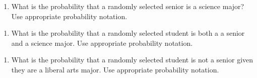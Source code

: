 \documentclass[
]{report}
\providecommand{\tightlist}{%
  \setlength{\itemsep}{0pt}\setlength{\parskip}{0pt}}
\begin{document}
\begin{enumerate}
\def\labelenumi{\alph{enumi}.}
\tightlist
\item
  What is the probability that a randomly selected senior is a science major? Use appropriate probability notation.
\end{enumerate}

\vspace{0.35in}

\begin{enumerate}
\def\labelenumi{\alph{enumi}.}
\setcounter{enumi}{1}
\tightlist
\item
  What is the probability that a randomly selected student is both a a senior and a science major. Use appropriate probability notation.
\end{enumerate}

\vspace{0.35in}

\begin{enumerate}
\def\labelenumi{\alph{enumi}.}
\setcounter{enumi}{2}
\tightlist
\item
  What is the probability that a randomly selected student is not a senior given they are a liberal arts major. Use appropriate probability notation.
\end{enumerate}

\vspace{0.35in}
\end{document}
